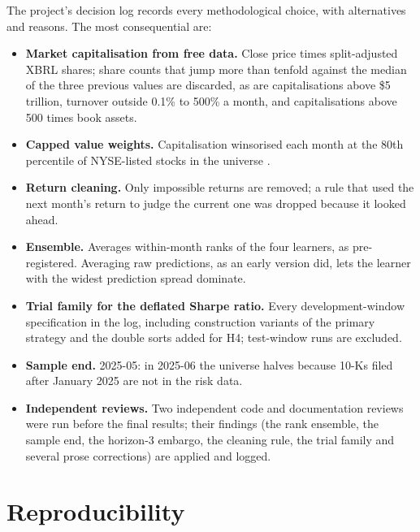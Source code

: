 \documentclass[11pt,a4paper]{article}
\begin{document}
The project's decision log records every methodological choice, with alternatives and reasons. The most consequential are:
\begin{itemize}
  \item \textbf{Market capitalisation from free data.} Close price times split-adjusted XBRL shares; share counts that jump more
  than tenfold against the median of the three previous values are discarded, as are capitalisations above \$5 trillion,
  turnover outside 0.1\% to 500\% a month, and capitalisations above 500 times book assets.
  \item \textbf{Capped value weights.} Capitalisation winsorised each month at the 80th percentile of NYSE-listed stocks in the
  universe \citep{jkp2023}.
  \item \textbf{Return cleaning.} Only impossible returns are removed; a rule that used the next month's return to judge the
  current one was dropped because it looked ahead.
  \item \textbf{Ensemble.} Averages within-month ranks of the four learners, as pre-registered. Averaging raw predictions,
  as an early version did, lets the learner with the widest prediction spread dominate.
  \item \textbf{Trial family for the deflated Sharpe ratio.} Every development-window specification in the log, including
  construction variants of the primary strategy and the double sorts added for H4; test-window runs are excluded.
  \item \textbf{Sample end.} 2025-05: in 2025-06 the universe halves because 10-Ks filed after January 2025 are not in the risk data.
  \item \textbf{Independent reviews.} Two independent code and documentation reviews were run before the final results; their
  findings (the rank ensemble, the sample end, the horizon-3 embargo, the cleaning rule, the trial family and several prose
  corrections) are applied and logged.
\end{itemize}

\section{Reproducibility}\label{app:repro}
\end{document}
